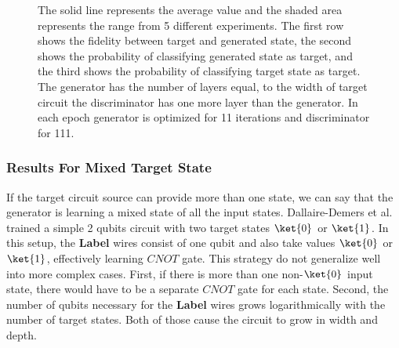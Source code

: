 \begin{figure}[htbp!]
  \caption{The solid line represents the average value and the shaded area
    represents the range from 5 different experiments. The first row shows the fidelity
    between target and generated state, the second shows the probability of
    classifying generated state as target, and the third shows the probability of
    classifying target state as target. The generator has the
    number of layers equal, to the width of target circuit the discriminator has one
    more layer than the generator. In each epoch generator is optimized for 11 iterations and
  discriminator for 111. }
  \label{fig:sqgans_res_3}
\end{figure}
\subsubsection{Results For Mixed Target State}
If the target circuit source can provide more than one state, we can say that the
generator is learning a mixed state of all the input states. Dallaire-Demers et
al. \cite{Dallaire_Demers_2018} trained a simple 2 qubits circuit with two target
states $\ket{0}$ or $\ket{1}$. In this setup, the \textbf{Label} wires consist
of one qubit and also take values $\ket{0}$ or $\ket{1}$, effectively learning
$CNOT$ gate. This strategy do not generalize well into more complex cases.
First, if there is more than one non-$\ket{0}$ input state, there would have to
be a separate $CNOT$ gate for each state. Second, the number of qubits necessary
for the \textbf{Label} wires grows logarithmically with the number of target
states. Both of those cause the circuit to grow in width and depth.

